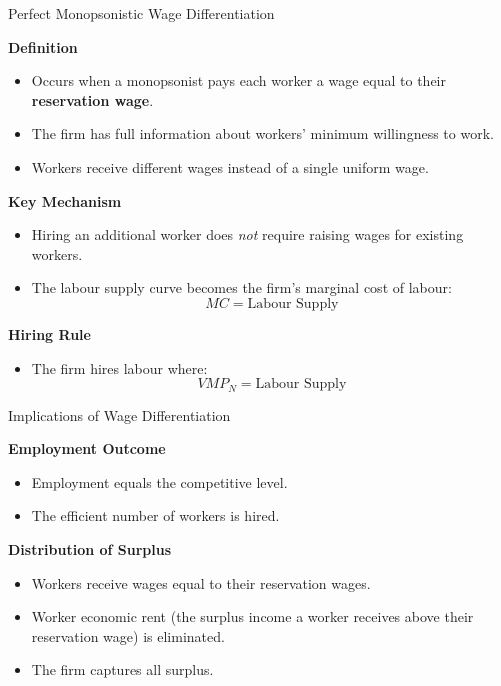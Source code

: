 \documentclass[aspectratio=169]{beamer}
\begin{document}
\begin{frame}{Perfect Monopsonistic Wage Differentiation}

\textbf{Definition}
\begin{itemize}[<+->]
\item Occurs when a monopsonist pays each worker a wage equal to their \textbf{reservation wage}.
\item The firm has full information about workers’ minimum willingness to work.
\item Workers receive different wages instead of a single uniform wage.
\end{itemize}

\textbf{Key Mechanism}
\begin{itemize}[<+->]
\item Hiring an additional worker does \emph{not} require raising wages for existing workers.
\item The labour supply curve becomes the firm's marginal cost of labour:
\[
MC = \text{Labour Supply}
\]
\end{itemize}

\textbf{Hiring Rule}
\begin{itemize}[<+->]
\item The firm hires labour where:
\[
VMP_N = \text{Labour Supply}
\]
\end{itemize}

\end{frame}

\begin{frame}{Implications of Wage Differentiation}

\textbf{Employment Outcome}
\begin{itemize}
\item Employment equals the competitive level.
\item The efficient number of workers is hired.
\end{itemize}

\textbf{Distribution of Surplus}
\begin{itemize}
\item Workers receive wages equal to their reservation wages.
\item Worker economic rent (the surplus income a worker receives above their reservation wage) is eliminated.
\item The firm captures all surplus.
\end{itemize}
\end{frame}
\end{document}
